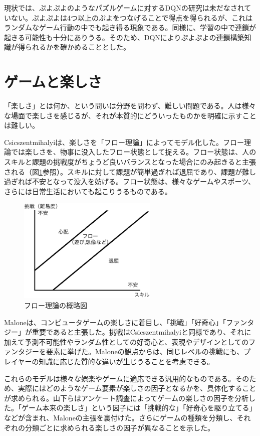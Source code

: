 \documentclass[12pt]{jreport}
\begin{document}
現状では、ぷよぷよのようなパズルゲームに対するDQNの研究は未だなされていない。ぷよぷよは4つ以上のぷよをつなげることで得点を得られるが、これはランダムなゲーム行動の中でも起き得る現象である。同様に、学習の中で連鎖が起きる可能性も十分にありうる。そのため、DQNによりぷよぷよの連鎖構築知識が得られるかを確かめることとした。

\section{ゲームと楽しさ}
「楽しさ」とは何か、という問いは分野を問わず、難しい問題である。人は様々な場面で楽しさを感じるが、それが本質的にどういったものかを明確に示すことは難しい。

Csicszentmihalyi\cite{csikszentmihalyi}は、楽しさを「フロー理論」によってモデル化した。フロー理論では楽しさを、物事に没入したフロー状態として捉える。フロー状態は、人のスキルと課題の挑戦度がちょうど良いバランスとなった場合にのみ起きると主張される（図\ref{fig:flow}参照）。スキルに対して課題が簡単過ぎれば退屈であり、課題が難し過ぎれば不安となって没入を妨げる。フロー状態は、様々なゲームやスポーツ、さらには日常生活においても起こりうるものである。

\begin{figure}[tb]
  \begin{center}
  \includegraphics[height=5cm]{img/flow_theory.png}
  \caption{フロー理論の概略図} \label{fig:flow}
\end{center}
\end{figure}

Malone\cite{malone}は、コンピュータゲームの楽しさに着目し、「挑戦」「好奇心」「ファンタジー」が重要であると主張した。挑戦はCsicszentmihalyiと同様であり、それに加えて予測不可能性やランダム性としての好奇心と、表現やデザインとしてのファンタジーを要素に挙げた。Maloneの観点からは、同じレベルの挑戦にも、プレイヤーの知識に応じた質的な違いが生じうることを考慮できる。

これらのモデルは様々な娯楽やゲームに適応できる汎用的なものである。そのため、実際にはどのようなゲーム要素が楽しさの因子となるかを、具体化することが求められる。山下ら\cite{tanosisa}はアンケート調査によってゲームの楽しさの因子を分析した。「ゲーム本来の楽しさ」という因子には「挑戦的な」「好奇心を駆り立てる」などが含まれ、Maloneの主張を裏付けた。さらにゲームの種類を分類し、それぞれの分類ごとに求められる楽しさの因子が異なることを示した。
\end{document}
